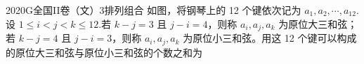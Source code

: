 
\begin{problem}{2020}{G}{全国II卷（文）}{3}{排列组合}
如图，将钢琴上的 12 个键依次记为 $ a_1,a_2,\cdots,a_{12} $.设 $ 1\leqslant i<j<k\leqslant 12 $.若 $ k-j=3 $ 且 $ j-i=4 $，则称 $ a_i,a_j,a_k $ 为原位大三和弦；若 $ k-j=4 $ 且 $ j-i=3 $，则称 $ a_i,a_j,a_k $ 为原位小三和弦。用这 12 个键可以构成的原位大三和弦与原位小三和弦的个数之和为
\begin{choices}
\end{choices}
\end{problem}

\begin{answer}

\end{answer}

\begin{solutions}

\end{solutions}